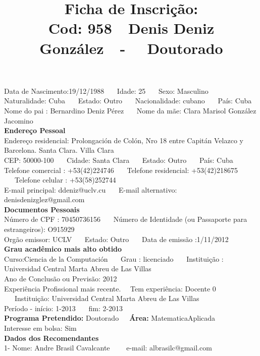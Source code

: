 \documentclass[11pt]{article}
\title{\vspace*{-4cm} Ficha de Inscrição: \\Cod: 958\ \ Denis Deniz González\ \ - \ \ Doutorado 
 }
\date{}
\begin{document}
\maketitle
\vspace*{-1.5cm}
\noindent Data de Nascimento:19/12/1988
\ \ \ Idade: 25   \ \ \ Sexo: Masculino
\\
Naturalidade: Cuba  
\ \ \  Estado: Outro
\ \ \  Nacionalidade: cubano
\ \ \ País: Cuba
\\        
Nome do pai : Bernardino Deniz Pérez
\ \ \ Nome da mãe: Clara Marisol González Jacomino          
\\[0.2cm]                     
\textbf{Endereço Pessoal} 
\\ 
\noindent Endereço residencial: Prolongación de Colón, Nro 18 entre Capitán Velazco y Barcelona. Santa Clara. Villa Clara
\\
        CEP: 50000-100 
\ \ \ Cidade: Santa Clara 
\ \ \ Estado: Outro 
\ \ \ País: Cuba
\\		
		Telefone comercial : +53(42)224746
\ \ \ Telefone residencial: +53(42)218675
\ \ \ Telefone celular : +53(58)252744
\\
E-mail principal: ddeniz@uclv.cu
\ \ \ E-mail alternativo: denisdenizglez@gmail.com 
\\[0.2cm] 
\textbf{Documentos Pessoais}
\\
\noindent Número de CPF : 70450736156
\ \ \ Número de Identidade (ou Passaporte para estrangeiros): O915929
\\
Orgão emissor: UCLV
\ \ \ Estado: Outro
\ \ \ Data de emissão :1/11/2012
\\[0.3cm]
\textbf{Grau acadêmico mais alto obtido}
\\	
Curso:Ciencia de la Computación
\ \ \ Grau : licenciado
\ \ \ Instituição : Universidad Central Marta Abreu de Las Villas
\\			
Ano de Conclusão ou Previsão: 2012
\\ 
Experiência Profissional mais recente. \ \  
Tem experiência: Docente 0  
\ \ \ Instituição: Universidad Central Marta Abreu de Las Villas
\\  
Período - início: 1-2013
\ \ \ fim: 2-2013
\\[0.2cm] 
\textbf{Programa Pretendido:} Doutorado\ \ \ \textbf{Área:} MatematicaAplicada\\
Interesse em bolsa: Sim
\\[0.3cm]		
\textbf{Dados dos Recomendantes} 
\\
1- Nome: Andre Brasil Cavalcante
\ \ \ \  e-mail: albrasilc@gmail.com 
\end{document}
